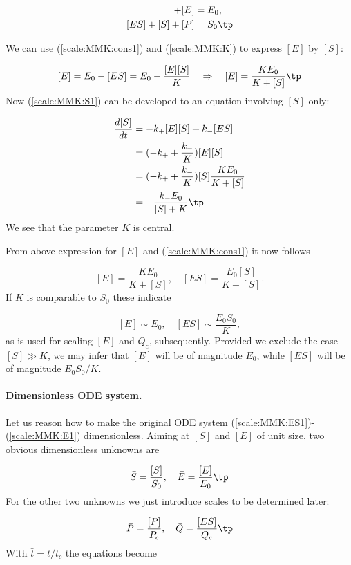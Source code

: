 \documentclass[graybox,envcountchap,sectrefs,final]{svmonodo}
\begin{document}
\begin{align}
[ES] + [E] &= E_0,
\label{scale:MMK:cons1}\\ 
[ES] + [S] + [P] &= S_0\tp
\label{scale:MMK:cons2}
\end{align}

We can use (\ref{scale:MMK:cons1}) and (\ref{scale:MMK:K}) to
express $[E]$ by $[S]$:

\[ [E] = E_0 - [ES] = E_0 - \frac{[E][S]}{K}\quad\Rightarrow\quad
[E] = \frac{KE_0}{K + [S]}\tp\]
Now (\ref{scale:MMK:S1}) can be developed to an equation involving
$[S]$ only:

\begin{align}
\frac{d[S]}{dt} &= -k_+[E][S] + k_-[ES]\nonumber\\ 
& = (-k_+ + \frac{k_-}{K})[E][S]\nonumber\\ 
& = (-k_+ + \frac{k_-}{K})[S]\frac{KE_0}{K + [S]}\nonumber\\ 
& = - \frac{k_-E_0}{[S] + K}\tp
\label{scale:MMK:Seq1}
\end{align}
We see that the parameter $K$ is central.

From above expression for $[E]$ and (\ref{scale:MMK:cons1}) it now follows

\[
[E]=\frac{K E_0}{K+[S]},\quad [ES]=\frac{E_0[S]}{K+[S]}.
\]
If $K$ is comparable to $S_0$ these indicate

\[
[E]\sim E_0,\quad [ES]\sim \frac{E_0 S_0}{K},
\]
as is used for scaling $[E]$ and $Q_c$, subsequently.
Provided we exclude the case $[S]\gg K$, we may infer that $[E]$ will be of magnitude $E_0$, while $[ES]$ will be of magnitude $E_0 S_0/K$.

\paragraph{Dimensionless ODE system.}
Let us reason how to make the original ODE system
(\ref{scale:MMK:ES1})-(\ref{scale:MMK:E1}) dimensionless.
Aiming at $[S]$ and $[E]$ of unit size, two obvious dimensionless
unknowns are

\[ \bar S = \frac{[S]}{S_0},\quad
\bar E = \frac{[E]}{E_0}\tp\]
For the other two unknowns we just introduce scales to be determined
later:

\[
\bar P = \frac{[P]}{P_c},\quad
\bar{Q} = \frac{[ES]}{Q_c}\tp
\]
With $\bar t = t/t_c$ the equations become
\end{document}
